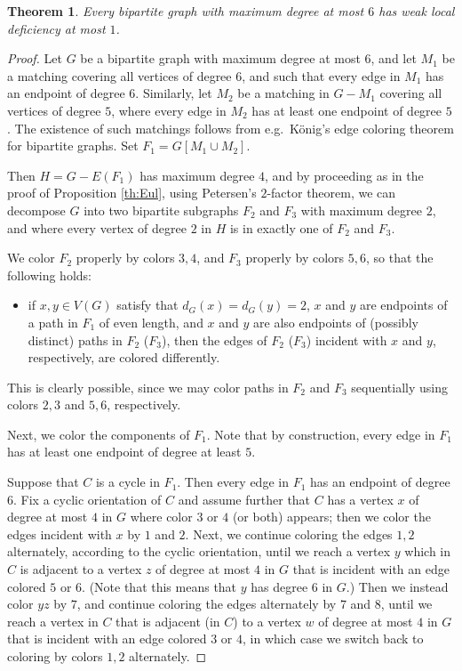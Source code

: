 \documentclass[12pt]{article}
\theoremstyle{plain}
\newtheorem{theorem}{Theorem}[section]
\theoremstyle{definition}
\numberwithin{equation}{section}
\begin{document}
\begin{theorem}
\label{th:bip6}
	Every bipartite graph with maximum degree at most $6$ has weak local deficiency at most $1$.
\end{theorem}
\begin{proof}
	Let $G$ be a bipartite graph with maximum degree at most $6$, and 
	let $M_1$ be a matching covering all vertices of degree $6$,
	and such that every edge in $M_1$ has an endpoint of degree $6$. Similarly, let 
	$M_2$ be a matching in $G-M_1$ covering all vertices
	of degree $5$, where every edge in $M_2$ has at least one endpoint of degree $5$. 
	The existence of such matchings follows from 
	e.g.~K\"onig's edge coloring theorem for bipartite graphs.
	Set $F_1 = G[M_1 \cup M_2]$. 
	
	Then $H=G - E(F_1)$ has maximum degree $4$, and by proceeding as
	in the proof of Proposition \ref{th:Eul}, using
	Petersen's $2$-factor theorem, we can decompose
	$G$ into two bipartite subgraphs $F_2$ and $F_3$ 
	with maximum degree $2$, and where every vertex of degree $2$ in $H$ is in exactly
	one of $F_2$ and $F_3$.
	
We color $F_2$ properly by colors $3,4$, and $F_3$ properly by colors $5,6$, so that the following holds:
	

\begin{itemize}
	\item[(*)]	 if $x, y \in V(G)$ satisfy that $d_G(x) = d_G(y) =2$,
	$x$ and $y$ are endpoints of a path in $F_1$ of even length, and $x$ and $y$ are also endpoints of (possibly distinct) paths in $F_2$ ($F_3$), then
	the edges of $F_2$ ($F_3$) incident with $x$ and $y$, respectively, are colored differently. 
\end{itemize}
	This is clearly possible, since we may color paths  in $F_2$ and $F_3$ 
	sequentially using colors $2,3$ and $5,6$, respectively.

\bigskip

	Next, we color the components of $F_1$. Note that by construction, every edge in $F_1$ has at least one 
	endpoint of degree at least $5$. 
	
	Suppose that $C$ is a cycle in $F_1$. Then every edge in $F_1$ 
	has an endpoint of degree $6$. Fix a cyclic orientation of $C$ and
	assume further that $C$ has a vertex $x$ of degree at most $4$ in $G$ where color $3$ or $4$ (or both)
	appears; then
	we color the edges incident with $x$ by $1$ and $2$. Next, we continue coloring the edges $1,2$ alternately,
	according to the cyclic orientation,
	until we reach a vertex $y$ which in $C$ is adjacent to a vertex $z$ of degree at most $4$ in $G$ that is
	incident with an edge colored $5$ or $6$.
	(Note that this means that $y$ has degree $6$ in $G$.)
	Then we instead color $yz$ by $7$, and continue coloring the edges alternately by $7$ and $8$, until we
	reach a vertex in $C$ that is
	adjacent (in $C$) to a vertex $w$ of degree at most $4$ in $G$ that is incident with an edge 
	colored $3$ or $4$, in which
	case we switch back to coloring by colors $1,2$ alternately. 


\end{proof}
\end{document}

